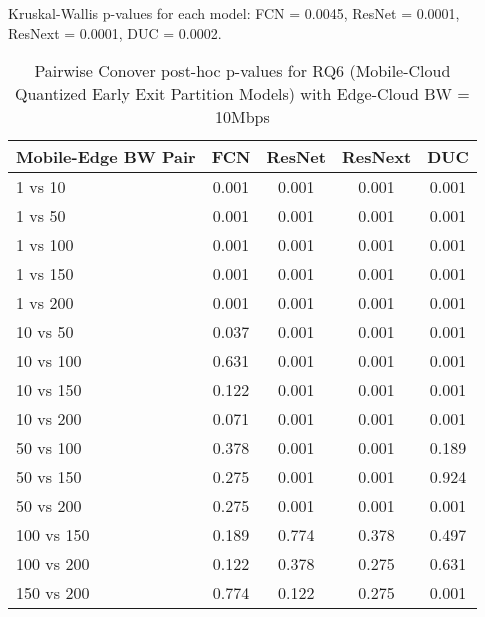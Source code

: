 \begin{table}[h]
\centering
\caption{Pairwise Conover post-hoc p-values for RQ6 (Mobile-Cloud Quantized Early Exit Partition Models) with Edge-Cloud BW = 10Mbps}
\label{tab:conover_mobile_cloud_quantized_earlyexit_partition_ec10}
\smallskip
Kruskal-Wallis p-values for each model: FCN = 0.0045, ResNet = 0.0001, ResNext = 0.0001, DUC = 0.0002.

\begin{tabular}{lcccc}
\toprule
Mobile-Edge BW Pair & FCN & ResNet & ResNext & DUC \\
\midrule
1 vs 10 & 0.001 & 0.001 & 0.001 & 0.001 \\
1 vs 50 & 0.001 & 0.001 & 0.001 & 0.001 \\
1 vs 100 & 0.001 & 0.001 & 0.001 & 0.001 \\
1 vs 150 & 0.001 & 0.001 & 0.001 & 0.001 \\
1 vs 200 & 0.001 & 0.001 & 0.001 & 0.001 \\
10 vs 50 & 0.037 & 0.001 & 0.001 & 0.001 \\
10 vs 100 & 0.631 & 0.001 & 0.001 & 0.001 \\
10 vs 150 & 0.122 & 0.001 & 0.001 & 0.001 \\
10 vs 200 & 0.071 & 0.001 & 0.001 & 0.001 \\
50 vs 100 & 0.378 & 0.001 & 0.001 & 0.189 \\
50 vs 150 & 0.275 & 0.001 & 0.001 & 0.924 \\
50 vs 200 & 0.275 & 0.001 & 0.001 & 0.001 \\
100 vs 150 & 0.189 & 0.774 & 0.378 & 0.497 \\
100 vs 200 & 0.122 & 0.378 & 0.275 & 0.631 \\
150 vs 200 & 0.774 & 0.122 & 0.275 & 0.001 \\
\bottomrule
\end{tabular}
\end{table}

